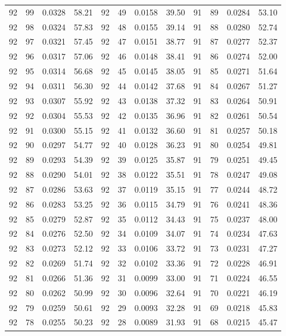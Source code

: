 \begin{tabular}{llll|llll|llll}
92 & 99 & 0.0328 & 58.21 & 92 & 49 & 0.0158 & 39.50 & 91 & 89 & 0.0284 & 53.10\\
92 & 98 & 0.0324 & 57.83 & 92 & 48 & 0.0155 & 39.14 & 91 & 88 & 0.0280 & 52.74\\
92 & 97 & 0.0321 & 57.45 & 92 & 47 & 0.0151 & 38.77 & 91 & 87 & 0.0277 & 52.37\\
92 & 96 & 0.0317 & 57.06 & 92 & 46 & 0.0148 & 38.41 & 91 & 86 & 0.0274 & 52.00\\
92 & 95 & 0.0314 & 56.68 & 92 & 45 & 0.0145 & 38.05 & 91 & 85 & 0.0271 & 51.64\\
92 & 94 & 0.0311 & 56.30 & 92 & 44 & 0.0142 & 37.68 & 91 & 84 & 0.0267 & 51.27\\
92 & 93 & 0.0307 & 55.92 & 92 & 43 & 0.0138 & 37.32 & 91 & 83 & 0.0264 & 50.91\\
92 & 92 & 0.0304 & 55.53 & 92 & 42 & 0.0135 & 36.96 & 91 & 82 & 0.0261 & 50.54\\
92 & 91 & 0.0300 & 55.15 & 92 & 41 & 0.0132 & 36.60 & 91 & 81 & 0.0257 & 50.18\\
92 & 90 & 0.0297 & 54.77 & 92 & 40 & 0.0128 & 36.23 & 91 & 80 & 0.0254 & 49.81\\
92 & 89 & 0.0293 & 54.39 & 92 & 39 & 0.0125 & 35.87 & 91 & 79 & 0.0251 & 49.45\\
92 & 88 & 0.0290 & 54.01 & 92 & 38 & 0.0122 & 35.51 & 91 & 78 & 0.0247 & 49.08\\
92 & 87 & 0.0286 & 53.63 & 92 & 37 & 0.0119 & 35.15 & 91 & 77 & 0.0244 & 48.72\\
92 & 86 & 0.0283 & 53.25 & 92 & 36 & 0.0115 & 34.79 & 91 & 76 & 0.0241 & 48.36\\
92 & 85 & 0.0279 & 52.87 & 92 & 35 & 0.0112 & 34.43 & 91 & 75 & 0.0237 & 48.00\\
92 & 84 & 0.0276 & 52.50 & 92 & 34 & 0.0109 & 34.07 & 91 & 74 & 0.0234 & 47.63\\
92 & 83 & 0.0273 & 52.12 & 92 & 33 & 0.0106 & 33.72 & 91 & 73 & 0.0231 & 47.27\\
92 & 82 & 0.0269 & 51.74 & 92 & 32 & 0.0102 & 33.36 & 91 & 72 & 0.0228 & 46.91\\
92 & 81 & 0.0266 & 51.36 & 92 & 31 & 0.0099 & 33.00 & 91 & 71 & 0.0224 & 46.55\\
92 & 80 & 0.0262 & 50.99 & 92 & 30 & 0.0096 & 32.64 & 91 & 70 & 0.0221 & 46.19\\
92 & 79 & 0.0259 & 50.61 & 92 & 29 & 0.0093 & 32.28 & 91 & 69 & 0.0218 & 45.83\\
92 & 78 & 0.0255 & 50.23 & 92 & 28 & 0.0089 & 31.93 & 91 & 68 & 0.0215 & 45.47\\

\end{tabular}
